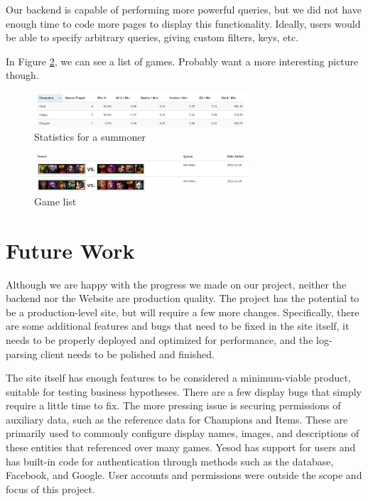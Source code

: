 \documentclass[letterpaper,twocolumn,9pt]{article}
\begin{document}
Our backend is capable of performing more powerful queries, but we did not have enough time to code more pages to display this functionality. Ideally, users would be able to specify arbitrary queries, giving custom filters, keys, etc.

In Figure \ref{list}, we can see a list of games. Probably want a more interesting picture though.

\begin{figure}[h]
    \includegraphics[width=80mm]{imgs/stats.png}
    \caption{Statistics for a summoner}
    \label{chart}
\end{figure}

\begin{figure}[h]
    \includegraphics[width=80mm]{imgs/gamelist.png}
    \caption{Game list}
    \label{list}
\end{figure}

\section{Future Work}
\label{future}

Although we are happy with the progress we made on our project, neither the backend nor the Website are production quality.   The project has the potential to be a production-level site, but will require a few more changes.  Specifically, there are some additional features and bugs that need to be fixed in the site itself, it needs to be properly deployed and optimized for performance, and the log-parsing client needs to be polished and finished.

The site itself has enough features to be considered a minimum-viable product, suitable for testing business hypotheses.  There are a few display bugs that simply require a little time to fix.  The more pressing issue is securing permissions of auxiliary data, such as the reference data for Champions and Items.  These are primarily used to commonly configure display names, images, and descriptions of these entities that referenced over many games.  Yesod has support for users and has built-in code for authentication through methods such as the database, Facebook, and Google.  User accounts and permissions were outside the scope and focus of this project.
\end{document}
